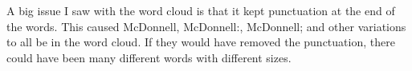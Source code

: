 \documentclass[12pt]{article}
\begin{document}
A big issue I saw with the word cloud is that it kept punctuation at the end of the words.  This caused McDonnell, McDonnell:, McDonnell; and other variations to all be in the word cloud.  If they would have removed the punctuation, there could have been many different words with different sizes.



\printbibliography
\end{document}
